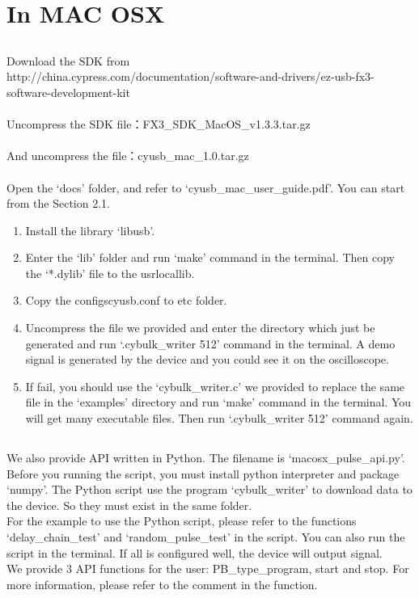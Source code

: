 \chapter{\heiti In MAC OSX}
\section{}

\noindent Download the SDK from 
\\{http://china.cypress.com/documentation/software-and-drivers/ez-usb-fx3-software-development-kit}
\\ \\
Uncompress the SDK file：FX3\_SDK\_MacOS\_v1.3.3.tar.gz
\\ \\ 
And uncompress the file：cyusb\_mac\_1.0.tar.gz
\\ \\
Open the `docs' folder, and refer to `cyusb\_mac\_user\_guide.pdf'. You can start from the Section 2.1.

\begin{enumerate}
\item Install the library `libusb'.
\item Enter the `lib' folder and run `make' command in the terminal. Then copy the `*.dylib' file to the \/usr\/local\/lib.
\item Copy the configs\/cyusb.conf to \/etc folder.
\item Uncompress the file we provided and enter the directory which just be generated and run `.\/cybulk\_writer 512' command in the terminal. A demo signal is generated by the device and you could see it on the oscilloscope.
\item If fail, you should use the `cybulk\_writer.c' we provided to replace the same file in the  `examples' directory and run `make' command in the terminal. You will get many executable files. Then run `.\/cybulk\_writer 512' command again.
\end{enumerate}

\section{}

We also provide API written in Python. The filename is `macosx\_pulse\_api.py'. Before you running the script, you must install python interpreter and package `numpy'. The Python script use the program `cybulk\_writer' to download data to the device. So they must exist in the same folder.
\\
\indent For the example to use the Python script, please refer to the functions `delay\_chain\_test' and `random\_pulse\_test' in the script. You can also run the script in the terminal. If all is configured well, the device will output signal.
\\
\indent We provide 3 API functions for the user: PB\_type\_program, start and stop. For more information, please refer to the comment in the function.
\\

